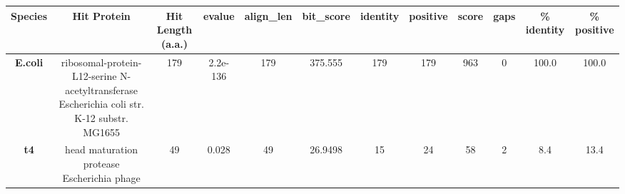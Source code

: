 \begin{tabular}{|c|c|c|c|c|c|c|c|c|c|c|c|} \hline
\textbf{Species} & \textbf{Hit Protein} & \textbf{Hit Length (a.a.)} & \textbf{evalue} & \textbf{align\_len} & \textbf{bit\_score} & \textbf{identity} & \textbf{positive} & \textbf{score} & \textbf{gaps} & \textbf{\% identity} & \textbf{\% positive} \\ \hline
\textbf{E.coli} & ribosomal-protein-L12-serine N-acetyltransferase Escherichia coli str. K-12 substr. MG1655 & 179 & 2.2e-136 & 179 & 375.555 & 179 & 179 & 963 & 0 & 100.0 & 100.0\\
\textbf{t4} & head maturation protease Escherichia phage  & 49 & 0.028 & 49 & 26.9498 & 15 & 24 & 58 & 2 & 8.4 & 13.4\\
\hline \end{tabular}
